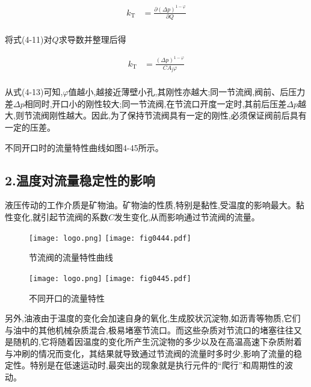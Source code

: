 \begin{equation}
\begin{split}
k_\text{T} & =\frac{\partial(\Delta p)^{1-\varphi}}{\partial Q}\\ 
\end{split}
\end{equation}

将式(4-11)对$Q$求导数并整理后得

\begin{equation}
\begin{split}
k_\text{T} & =\frac{(\Delta p)^{1-\varphi}}{CA_\text{j}\varphi}\\ 
\end{split}
\end{equation}

从式(4-13)可知,$\varphi$值越小,越接近薄壁小孔,其刚性亦越大;同一节流阀,阀前、后压力差$\Delta p$相同时,开口小的刚性较大;同一节流阀,在节流口开度一定时,其前后压差$\Delta p$越大,则节流阀刚性越大。因此,为了保持节流阀具有一定的刚性,必须保证阀前后具有一定的压差。

不同开口时的流量特性曲线如图4-45所示。

\subsection*{2.温度对流量稳定性的影响}

液压传动的工作介质是矿物油。矿物油的性质,特别是黏性,受温度的影响最大。黏性变化,就引起节流阀的系数$C$发生变化,从而影响通过节流阀的流量。

\begin{figure}
\centering
\ifOpenSource
\texttt{[image: logo.png]}
\else
\texttt{[image: fig0444.pdf]}
\fi
\caption{节流阀的流量特性曲线}
\label{fig:fig0444}
\end{figure}

\begin{figure}
\centering
\ifOpenSource
\texttt{[image: logo.png]}
\else
\texttt{[image: fig0445.pdf]}
\fi
\caption{不同开口的流量特性}
\label{fig:fig0445}
\end{figure}

另外,油液由于温度的变化会加速自身的氧化,生成胶状沉淀物,如沥青等物质,它们与油中的其他机械杂质混合,极易堵塞节流口。而这些杂质对节流口的堵塞往往又是随机的,它将随着因温度的变化所产生沉淀物的多少以及在高温高速下杂质附着与冲刷的情况而变化，其结果就导致通过节流阀的流量时多时少,影响了流量的稳定性。特别是在低速运动时,最突出的现象就是执行元件的“爬行”和周期性的波动。

